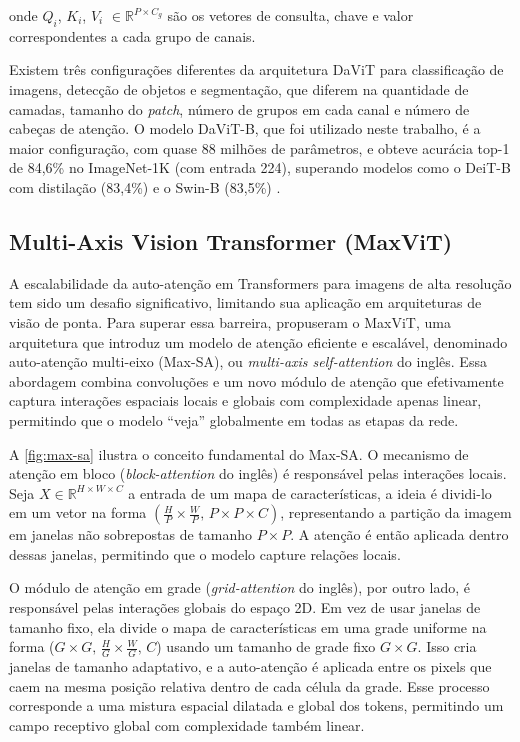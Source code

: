 onde $Q_i$, $K_i$, $V_i$ $\in \mathbb{R}^{P \times C_g}$ são os vetores de consulta, chave e valor correspondentes a cada grupo de canais.

Existem três configurações diferentes da arquitetura DaViT para classificação de imagens, detecção de objetos e segmentação, que diferem na quantidade de camadas, tamanho do \textit{patch}, número de grupos em cada canal e número de cabeças de atenção. O modelo DaViT-B, que foi utilizado neste trabalho, é a maior configuração, com quase 88 milhões de parâmetros, e obteve acurácia top-1 de 84,6\% no ImageNet-1K (com entrada 224), superando modelos como o DeiT-B com distilação (83,4\%) e o Swin-B (83,5\%) \citep{Touvron2021, Liu2021}.

\subsection{Multi-Axis Vision Transformer (MaxViT)}

A escalabilidade da auto-atenção em Transformers para imagens de alta resolução tem sido um desafio significativo, limitando sua aplicação em arquiteturas de visão de ponta. Para superar essa barreira, \cite{maxvit2022} propuseram o MaxViT, uma arquitetura que introduz um modelo de atenção eficiente e escalável, denominado auto-atenção multi-eixo (Max-SA), ou \textit{multi-axis self-attention} do inglês. Essa abordagem combina convoluções e um novo módulo de atenção que efetivamente captura interações espaciais locais e globais com complexidade apenas linear, permitindo que o modelo ``veja'' globalmente em todas as etapas da rede.

A \autoref{fig:max-sa} ilustra o conceito fundamental do Max-SA. O mecanismo de atenção em bloco (\textit{block-attention} do inglês) é responsável pelas interações locais. Seja $X \in \mathbb{R}^{H \times W \times C}$ a entrada de um mapa de características, a ideia é dividi-lo em um vetor na forma $(\frac{H}{P} \times \frac{W}{P} \text{, } P \times P \times C)$, representando a partição da imagem em janelas não sobrepostas de tamanho $P \times P$. A atenção é então aplicada dentro dessas janelas, permitindo que o modelo capture relações locais.

O módulo de atenção em grade (\textit{grid-attention} do inglês), por outro lado, é responsável pelas interações globais do espaço 2D. Em vez de usar janelas de tamanho fixo, ela divide o mapa de características em uma grade uniforme na forma ($G \times G \text{, } \frac{H}{G} \times \frac{W}{G} \text{, } C$) usando um tamanho de grade fixo $G \times G$. Isso cria janelas de tamanho adaptativo, e a auto-atenção é aplicada entre os pixels que caem na mesma posição relativa dentro de cada célula da grade. Esse processo corresponde a uma mistura espacial dilatada e global dos tokens, permitindo um campo receptivo global com complexidade também linear.

